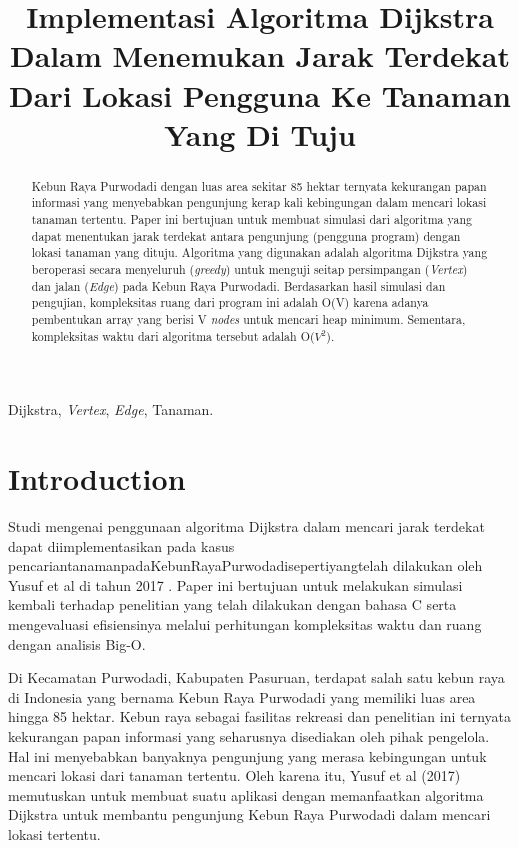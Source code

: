 \documentclass[conference]{IEEEtran}
\title{Implementasi Algoritma Dijkstra Dalam Menemukan Jarak Terdekat Dari Lokasi Pengguna Ke Tanaman Yang Di Tuju}
\author{\IEEEauthorblockN{Tanya Nuhaisy Wulandari}
\IEEEauthorblockA{\textit{School of Electrical Engineering an Informatics}\\
\textit{Institute Teknologi Bandung}\\
Bandung, Indonesia\\
Email: 18320017@std.stei.itb.ac.id}
}
\begin{document}
\maketitle

\begin{abstract}
Kebun Raya Purwodadi dengan luas area sekitar 85 hektar ternyata kekurangan papan informasi yang menyebabkan pengunjung kerap kali kebingungan dalam mencari lokasi tanaman tertentu. Paper ini bertujuan untuk membuat simulasi dari algoritma yang dapat menentukan jarak terdekat antara pengunjung (pengguna program) dengan lokasi tanaman yang dituju. Algoritma yang digunakan adalah algoritma Dijkstra yang beroperasi secara menyeluruh (\textit{greedy}) untuk menguji seitap persimpangan (\textit{Vertex}) dan jalan (\textit{Edge}) pada Kebun Raya Purwodadi. Berdasarkan hasil simulasi dan pengujian, kompleksitas ruang dari program ini adalah O(V) karena adanya pembentukan array yang berisi V \textit{nodes} untuk mencari heap minimum. Sementara, kompleksitas waktu dari algoritma tersebut adalah O($V^2$).
\end{abstract}

\begin{IEEEkeywords}
Dijkstra, \textit{Vertex}, \textit{Edge}, Tanaman.
\end{IEEEkeywords}

\section{Introduction}
Studi mengenai penggunaan algoritma Dijkstra dalam mencari jarak terdekat dapat diimplementasikan pada kasus pencariantanamanpadaKebunRayaPurwodadisepertiyangtelah dilakukan oleh Yusuf et al di tahun 2017 . Paper ini bertujuan untuk melakukan simulasi kembali terhadap penelitian yang telah dilakukan dengan bahasa C serta mengevaluasi eﬁsiensinya melalui perhitungan kompleksitas waktu dan ruang dengan analisis Big-O.

Di Kecamatan Purwodadi, Kabupaten Pasuruan, terdapat salah satu kebun raya di Indonesia yang bernama Kebun Raya Purwodadi yang memiliki luas area hingga 85 hektar. Kebun raya sebagai fasilitas rekreasi dan penelitian ini ternyata kekurangan papan informasi yang seharusnya disediakan oleh pihak pengelola. Hal ini menyebabkan banyaknya pengunjung yang merasa kebingungan untuk mencari lokasi dari tanaman tertentu. Oleh karena itu, Yusuf et al (2017) memutuskan untuk membuat suatu aplikasi dengan memanfaatkan algoritma Dijkstra untuk membantu pengunjung Kebun Raya Purwodadi dalam mencari lokasi tertentu.
\end{document}
